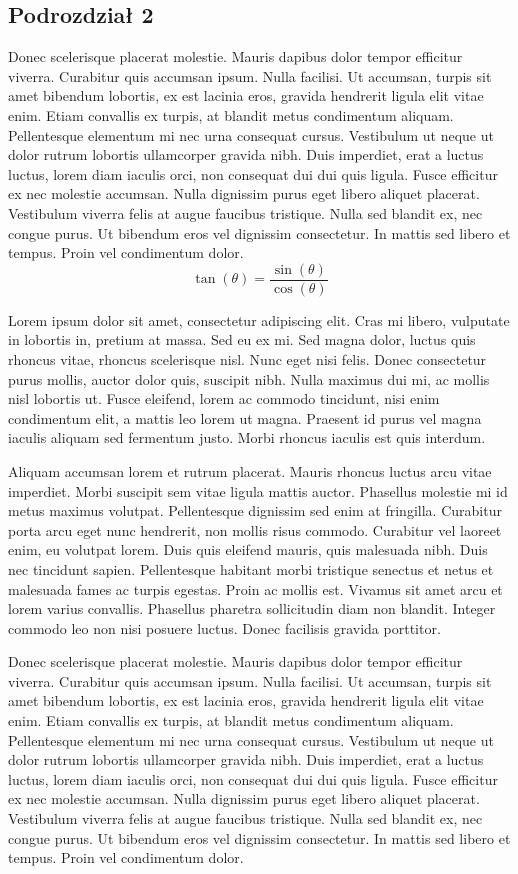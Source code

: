 \documentclass[12pt,a4paper]{article}
\begin{document}
	
	\subsection{Podrozdział 2}
	Donec scelerisque placerat molestie. Mauris dapibus dolor tempor efficitur viverra. Curabitur quis accumsan ipsum. Nulla facilisi. Ut accumsan, turpis sit amet bibendum lobortis, ex est lacinia eros, gravida hendrerit ligula elit vitae enim. Etiam convallis ex turpis, at blandit metus condimentum aliquam. Pellentesque elementum mi nec urna consequat cursus. Vestibulum ut neque ut dolor rutrum lobortis ullamcorper gravida nibh. Duis imperdiet, erat a luctus luctus, lorem diam iaculis orci, non consequat dui dui quis ligula. Fusce efficitur ex nec molestie accumsan. Nulla dignissim purus eget libero aliquet placerat. Vestibulum viverra felis at augue faucibus tristique. Nulla sed blandit ex, nec congue purus. Ut bibendum eros vel dignissim consectetur. In mattis sed libero et tempus. Proin vel condimentum dolor.
	\[
    \tan(\theta) = \frac{\sin(\theta)}{\cos(\theta)}
\] 
\label{wzor2}

Lorem ipsum dolor sit amet, consectetur adipiscing elit. Cras mi libero, vulputate in lobortis in, pretium at massa. Sed eu ex mi. Sed magna dolor, luctus quis rhoncus vitae, rhoncus scelerisque nisl. Nunc eget nisi felis. Donec consectetur purus mollis, auctor dolor quis, suscipit nibh. Nulla maximus dui mi, ac mollis nisl lobortis ut. Fusce eleifend, lorem ac commodo tincidunt, nisi enim condimentum elit, a mattis leo lorem ut magna. Praesent id purus vel magna iaculis aliquam sed fermentum justo. Morbi rhoncus iaculis est quis interdum.

Aliquam accumsan lorem et rutrum placerat. Mauris rhoncus luctus arcu vitae imperdiet. Morbi suscipit sem vitae ligula mattis auctor. Phasellus molestie mi id metus maximus volutpat. Pellentesque dignissim sed enim at fringilla. Curabitur porta arcu eget nunc hendrerit, non mollis risus commodo. Curabitur vel laoreet enim, eu volutpat lorem. Duis quis eleifend mauris, quis malesuada nibh. Duis nec tincidunt sapien. Pellentesque habitant morbi tristique senectus et netus et malesuada fames ac turpis egestas. Proin ac mollis est. Vivamus sit amet arcu et lorem varius convallis. Phasellus pharetra sollicitudin diam non blandit. Integer commodo leo non nisi posuere luctus. Donec facilisis gravida porttitor.

Donec scelerisque placerat molestie. Mauris dapibus dolor tempor efficitur viverra. Curabitur quis accumsan ipsum. Nulla facilisi. Ut accumsan, turpis sit amet bibendum lobortis, ex est lacinia eros, gravida hendrerit ligula elit vitae enim. Etiam convallis ex turpis, at blandit metus condimentum aliquam. Pellentesque elementum mi nec urna consequat cursus. Vestibulum ut neque ut dolor rutrum lobortis ullamcorper gravida nibh. Duis imperdiet, erat a luctus luctus, lorem diam iaculis orci, non consequat dui dui quis ligula. Fusce efficitur ex nec molestie accumsan. Nulla dignissim purus eget libero aliquet placerat. Vestibulum viverra felis at augue faucibus tristique. Nulla sed blandit ex, nec congue purus. Ut bibendum eros vel dignissim consectetur. In mattis sed libero et tempus. Proin vel condimentum dolor.
\end{document}
